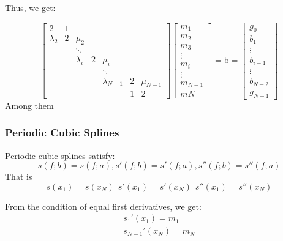\documentclass[a4paper]{article}
\begin{document}
Thus, we get:

\begin{equation}
\begin{bmatrix}2&1
\\\lambda_2&2&\mu_2
\\&&\ddots\\&&\lambda_i&2&\mu_i\\&&&&\ddots\\&&&&\lambda_{N-1}&2&\mu_{N-1}\\&&&&&1&2\end{bmatrix}\begin{bmatrix}m_1\\ m_2\\m_3\\\vdots\\m_i\\\vdots\\m_{N-1}\\mN\end{bmatrix}=\mathrm{b} = \begin{bmatrix}
    g_0 \\
    b_1 \\
    \vdots \\
    b_{i -1}\\
    \vdots \\
    b_{N-2}\\
    g_{N-1}
\end{bmatrix}
\end{equation}
Among them

\subsubsection{Periodic Cubic Splines}
Periodic cubic splines satisfy:
\begin{equation}
    s(f;b) = s(f;a),s' (f;b) = s' (f;a),s'' (f;b) = s''(f;a)
\end{equation}
That is
\begin{equation}
    s(x_1) = s(x_N) \ \ s'(x_1) = s'(x_N) \ \ s''(x_1) = s''(x_N)
\end{equation}

From the condition of equal first derivatives, we get:
\begin{gather}
    s_1'(x_1) = m_1 \\
    s_{N-1}'(x_N) = m_N 
\end{gather}
\end{document}

